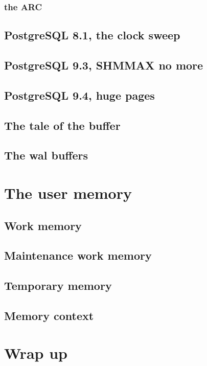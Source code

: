 \subsubsection{the ARC}

\subsection{PostgreSQL 8.1, the clock sweep}

\subsection{PostgreSQL 9.3, SHMMAX no more}

\subsection{PostgreSQL 9.4, huge pages}

\subsection{The tale of the buffer}


\subsection{The wal buffers}

\section{The user memory}
\subsection{Work memory}
\subsection{Maintenance work memory}
\subsection{Temporary memory}


\subsection{Memory context}

\section{Wrap up}